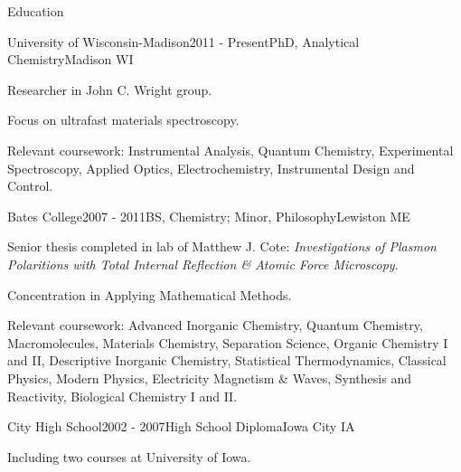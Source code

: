 \documentclass{resume}  %
\begin{document}
\begin{rSection}{Education}

\begin{rSubsection}{University of Wisconsin-Madison}{2011 - Present}{PhD, Analytical Chemistry}{Madison WI}
\item Researcher in John C. Wright group.
\item Focus on ultrafast materials spectroscopy.
\item Relevant coursework: Instrumental Analysis, Quantum Chemistry, 
Experimental Spectroscopy, Applied Optics, Electrochemistry, 
Instrumental Design and Control.
\end{rSubsection}

\begin{rSubsection}{Bates College}{2007 - 2011}{BS, Chemistry; Minor, Philosophy}{Lewiston ME}
\item Senior thesis completed in lab of Matthew J. Cote: \textit{Investigations of Plasmon Polaritions with Total Internal Reflection \& Atomic Force Microscopy}.
\item Concentration in Applying Mathematical Methods.
\item Relevant coursework: Advanced Inorganic Chemistry, Quantum Chemistry, Macromolecules,
Materials Chemistry, Separation Science, Organic Chemistry I and II,
Descriptive Inorganic Chemistry, Statistical Thermodynamics, Classical Physics,
Modern Physics, Electricity Magnetism \& Waves, Synthesis and Reactivity,
Biological Chemistry I and II.
\end{rSubsection}

\begin{rSubsection}{City High School}{2002 - 2007}{High School Diploma}{Iowa City IA}
\item Including two courses at University of Iowa.
\end{rSubsection}

\end{rSection}
\end{document}
